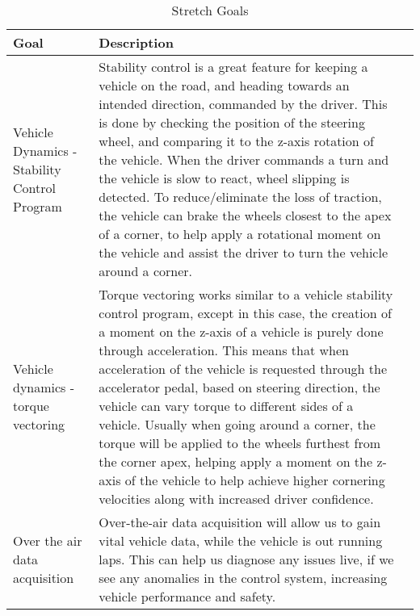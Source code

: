 \documentclass{article}
\begin{document}
\begin{table}[hp]
\caption{Stretch Goals} \label{TblStretchGoals}
\begin{tabularx}{\textwidth}{llX}
\toprule
\textbf{Goal} & \textbf{Description}\\
\midrule
Vehicle Dynamics - Stability Control Program & Stability control is a great 
feature for keeping a 
vehicle on the road, and heading towards an intended direction, commanded 
by the driver. This is done by checking the position of the steering wheel, 
and comparing it to the z-axis rotation of the vehicle. When the driver 
commands a turn and the vehicle is slow to react, wheel slipping is detected. 
To reduce/eliminate the loss of traction, the vehicle can brake the wheels 
closest to the apex of a corner, to help apply a rotational moment on the 
vehicle and assist the driver to turn the vehicle around a corner. \\
Vehicle dynamics - torque vectoring & Torque vectoring works similar to a 
vehicle stability control program, except in this case, the creation of a 
moment on the z-axis of a vehicle is purely done through acceleration. This 
means that when acceleration of the vehicle is requested through the accelerator 
pedal, based on steering direction, the vehicle can vary torque to different sides 
of a vehicle. Usually when going around a corner, the torque will be applied to 
the wheels furthest from the corner apex, helping apply a moment on the z-axis of 
the vehicle to help achieve higher cornering velocities along with increased driver 
confidence.\\
Over the air data acquisition & Over-the-air data acquisition will allow us to 
gain vital vehicle data, while the vehicle is out running laps. This can help 
us diagnose any issues live, if we see any anomalies in the control system, 
increasing vehicle performance and safety.\\
\bottomrule
\end{tabularx}
\end{table}
\end{document}
